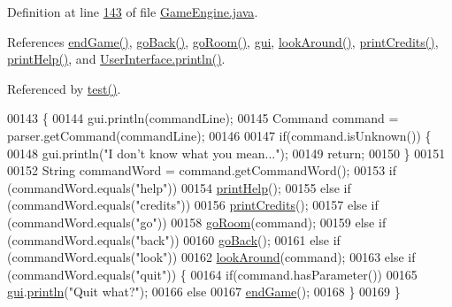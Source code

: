 Definition at line \hyperlink{GameEngine_8java_source_l00143}{143} of file \hyperlink{GameEngine_8java_source}{Game\-Engine.\-java}.



References \hyperlink{GameEngine_8java_source_l00276}{end\-Game()}, \hyperlink{GameEngine_8java_source_l00252}{go\-Back()}, \hyperlink{GameEngine_8java_source_l00206}{go\-Room()}, \hyperlink{GameEngine_8java_source_l00031}{gui}, \hyperlink{GameEngine_8java_source_l00264}{look\-Around()}, \hyperlink{GameEngine_8java_source_l00191}{print\-Credits()}, \hyperlink{GameEngine_8java_source_l00174}{print\-Help()}, and \hyperlink{UserInterface_8java_source_l00060}{User\-Interface.\-println()}.



Referenced by \hyperlink{GameEngine_8java_source_l00281}{test()}.


\begin{DoxyCode}
00143                                                    \{
00144         gui.println(commandLine);
00145         Command command = parser.getCommand(commandLine);
00146 
00147         \textcolor{keywordflow}{if}(command.isUnknown()) \{
00148             gui.println(\textcolor{stringliteral}{"I don't know what you mean..."});
00149             \textcolor{keywordflow}{return};
00150         \}
00151 
00152         String commandWord = command.getCommandWord();
00153         \textcolor{keywordflow}{if} (commandWord.equals(\textcolor{stringliteral}{"help"}))
00154             \hyperlink{classGameEngine_a8959e384cc77e69ab0ce9da8ba5057cd}{printHelp}();
00155         \textcolor{keywordflow}{else} \textcolor{keywordflow}{if} (commandWord.equals(\textcolor{stringliteral}{"credits"}))
00156             \hyperlink{classGameEngine_a0cc83a912708431a667e73c9a8aa3698}{printCredits}();
00157         \textcolor{keywordflow}{else} \textcolor{keywordflow}{if} (commandWord.equals(\textcolor{stringliteral}{"go"}))
00158             \hyperlink{classGameEngine_a2ec577574f345764435837fc0204b2e0}{goRoom}(command);
00159         \textcolor{keywordflow}{else} \textcolor{keywordflow}{if} (commandWord.equals(\textcolor{stringliteral}{"back"}))
00160             \hyperlink{classGameEngine_ac22dcdb540cb27f39597ee4f03ad167a}{goBack}();
00161         \textcolor{keywordflow}{else} \textcolor{keywordflow}{if} (commandWord.equals(\textcolor{stringliteral}{"look"}))
00162             \hyperlink{classGameEngine_ab620e2e6c8627aba28cc2c33fefe50e3}{lookAround}(command);
00163         \textcolor{keywordflow}{else} \textcolor{keywordflow}{if} (commandWord.equals(\textcolor{stringliteral}{"quit"})) \{
00164             \textcolor{keywordflow}{if}(command.hasParameter())
00165                 \hyperlink{classGameEngine_a2a7d0bb6183b3f3ef3ee2008926374a0}{gui}.\hyperlink{classUserInterface_a79f606b4b1f5d1523e50eea00039ed94}{println}(\textcolor{stringliteral}{"Quit what?"});
00166             \textcolor{keywordflow}{else}
00167                 \hyperlink{classGameEngine_abebbf1bda82aa3ca162f7187a64e41ed}{endGame}();
00168         \}
00169     \}
\end{DoxyCode}


